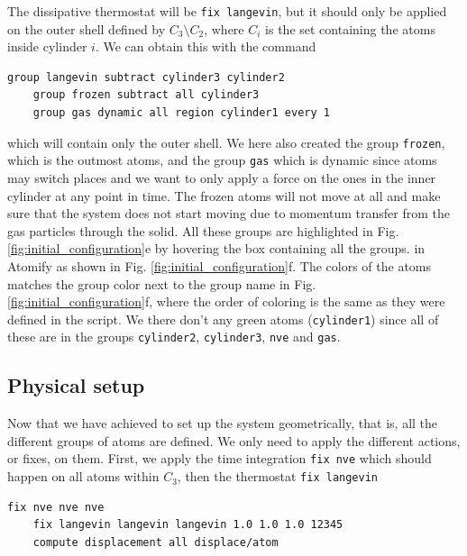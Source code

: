 \documentclass[aps,pre,twocolumn,letterpaper,floatfix,nofootinbib]{revtex4}
\newcommand{\code}[1]{\colorbox{light-gray}{\color{RawSienna}\texttt{#1}}}
\begin{document}
The dissipative thermostat will be \code{fix langevin}\citep{schneider1978molecular}, but it should only be applied on the outer shell defined by $C_3 \setminus C_2$,
where $C_i$ is the set containing the atoms inside cylinder $i$.
We can obtain this with the command

\begin{lstlisting}[basicstyle=\tiny, frame = none, numbers=none, framexleftmargin=0pt, xleftmargin=-0.75cm, xrightmargin=0.0cm]
	group langevin subtract cylinder3 cylinder2
	group frozen subtract all cylinder3
	group gas dynamic all region cylinder1 every 1
\end{lstlisting}

which will contain only the outer shell.
We here also created the group \code{frozen}, which is the outmost atoms, and the group \code{gas} which is dynamic since atoms may switch places and we want to only apply a force on the ones in the inner cylinder at any point in time.
The frozen atoms will not move at all and make sure that the system does not start moving due to momentum transfer from the gas particles through the solid.
All these groups are highlighted in Fig. \ref{fig:initial_configuration}e by hovering the box containing all the groups. in Atomify as shown in Fig. \ref{fig:initial_configuration}f.
The colors of the atoms matches the group color next to the group name in Fig. \ref{fig:initial_configuration}f, where the order of coloring is the same as they were defined in the script.
We there don't any green atoms (\code{cylinder1}) since all of these are in the groups \code{cylinder2}, \code{cylinder3}, \code{nve} and \code{gas}.

\subsection{Physical setup}
Now that we have achieved to set up the system geometrically, that is, all the different groups of atoms are defined.
We only need to apply the different actions, or fixes, on them.
First, we apply the time integration \code{fix nve} which should happen on all atoms within $C_3$, then the thermostat \code{fix langevin}

\begin{lstlisting}[basicstyle=\tiny, frame = none, numbers=none, framexleftmargin=0pt, xleftmargin=-0.75cm, xrightmargin=0.0cm]
	fix nve nve nve
	fix langevin langevin langevin 1.0 1.0 1.0 12345
	compute displacement all displace/atom
\end{lstlisting}
\end{document}

